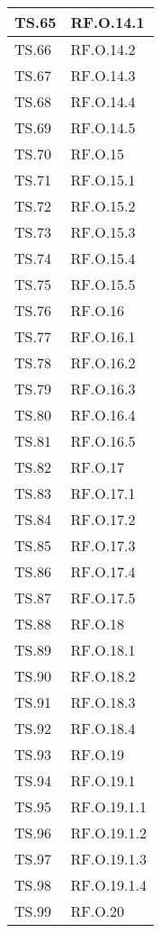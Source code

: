 {{{{{{{{{\begin{tabularx}{\textwidth}{p{}|X}
    \hline
    TS.65 & RF.O.14.1 \\
    \hline
    TS.66 & RF.O.14.2 \\
    \hline
    TS.67 & RF.O.14.3 \\
    \hline
    TS.68 & RF.O.14.4 \\
    \hline
    TS.69 & RF.O.14.5 \\
    \hline
    TS.70 & RF.O.15 \\
    \hline
    TS.71 & RF.O.15.1 \\
    \hline
    TS.72 & RF.O.15.2 \\
    \hline
    TS.73 & RF.O.15.3 \\
    \hline
    TS.74 & RF.O.15.4 \\
    \hline
    TS.75 & RF.O.15.5 \\
    \hline
    TS.76 & RF.O.16 \\
    \hline
    TS.77 & RF.O.16.1 \\
    \hline
    TS.78 & RF.O.16.2 \\
    \hline
    TS.79 & RF.O.16.3 \\
    \hline
    TS.80 & RF.O.16.4 \\
    \hline
    TS.81 & RF.O.16.5 \\
    \hline
    TS.82 & RF.O.17 \\
    \hline
    TS.83 & RF.O.17.1 \\
    \hline
    TS.84 & RF.O.17.2 \\
    \hline
    TS.85 & RF.O.17.3 \\
    \hline
    TS.86 & RF.O.17.4 \\
    \hline
    TS.87 & RF.O.17.5 \\
    \hline
    TS.88 & RF.O.18 \\
    \hline
    TS.89 & RF.O.18.1 \\
    \hline
    TS.90 & RF.O.18.2 \\
    \hline
    TS.91 & RF.O.18.3 \\
    \hline
    TS.92 & RF.O.18.4 \\
    \hline
    TS.93 & RF.O.19 \\
    \hline
    TS.94 & RF.O.19.1 \\
    \hline
    TS.95 & RF.O.19.1.1 \\
    \hline
    TS.96 & RF.O.19.1.2 \\
    \hline
    TS.97 & RF.O.19.1.3 \\
    \hline
    TS.98 & RF.O.19.1.4 \\
    \hline
    TS.99 & RF.O.20 \\

\end{tabularx}}}}}}}}}}
